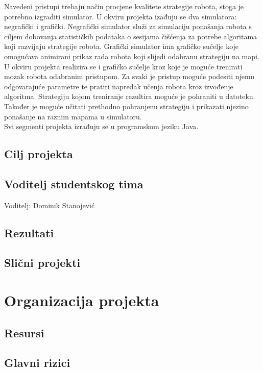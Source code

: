 \documentclass[times, utf8, numeric]{fer}
\begin{document}
\vspace{1ex}
Navedeni pristupi trebaju način procjene kvalitete strategije robota, stoga je potrebno izgraditi simulator. U okviru projekta izađuju se dva simulatora: negrafički i grafički. Negrafički simulator služi za simulaciju ponašanja robota s ciljem dobovanja statističkih podataka o sesijama čišćenja za potrebe algoritama koji razvijaju strategije robota. Grafički simulator ima grafičko sučelje koje omogućava animirani prikaz rada robota koji slijedi odabranu strategiju na mapi.
\vspace{1ex}\\
U okviru projekta realizira se i grafičko sučelje kroz koje je moguće trenirati mozak robota odabranim pristupom. Za svaki je pristup moguće podesiti njemu odgovarajuće parametre te pratiti napredak učenja robota kroz izvođenje algoritma. Strategiju kojom treniranje rezultira moguće je pohraniti u datoteku. Također je moguće učitati prethodno pohranjenu strategiju i prikazati njezino ponašanje na raznim mapama u simulatoru.
\\
Svi segmenti projekta izrađuju se u programskom jeziku Java.

\section{Cilj projekta}

\section{Voditelj studentskog tima}
Voditelj: Dominik Stanojević

\section{Rezultati}
\section{Slični projekti}

\chapter{Organizacija projekta}
\section{Resursi}
\section{Glavni rizici}
\end{document}
